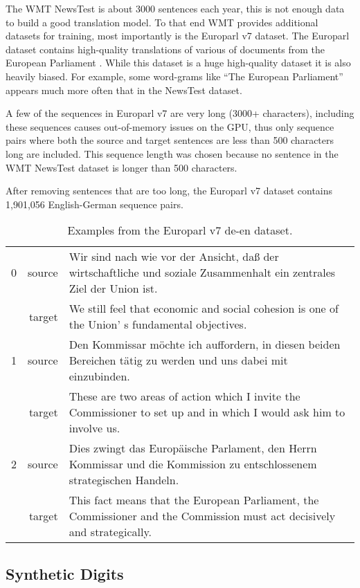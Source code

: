 The WMT NewsTest is about 3000 sentences each year, this is not enough data to build a good translation model. To that end WMT provides additional datasets for training, most importantly is the Europarl v7 dataset. The Europarl dataset contains high-quality translations of various of documents from the European Parliament \cite{europarl}. While this dataset is a huge high-quality dataset it is also heavily biased. For example, some word-grams like ``The European Parliament'' appears much more often that in the NewsTest dataset.

A few of the sequences in Europarl v7 are very long (3000+ characters), including these sequences causes out-of-memory issues on the GPU, thus only sequence pairs where both the source and target sentences are less than 500 characters long are included. This sequence length was chosen because no sentence in the WMT NewsTest dataset is longer than 500 characters.

After removing sentences that are too long, the Europarl v7 dataset contains 1,901,056 English-German sequence pairs.

\begin{table}[H]
\centering
\begin{tabular}{l|r|p{10cm}}
        0 & source & Wir sind nach wie vor der Ansicht, daß der wirtschaftliche und soziale Zusammenhalt ein zentrales Ziel der Union ist. \\[0.1cm]
          & target & We still feel that economic and social cohesion is one of the Union' s fundamental objectives. \\[0.1cm] \hline
        1 & source & Den Kommissar möchte ich auffordern, in diesen beiden Bereichen tätig zu werden und uns dabei mit einzubinden. \\[0.1cm]
          & target & These are two areas of action which I invite the Commissioner to set up and in which I would ask him to involve us. \\[0.1cm] \hline
        2 & source & Dies zwingt das Europäische Parlament, den Herrn Kommissar und die Kommission zu entschlossenem strategischen Handeln. \\[0.1cm]
          & target & This fact means that the European Parliament, the Commissioner and the Commission must act decisively and strategically.
\end{tabular}
\caption{Examples from the Europarl v7 de-en dataset.}
\end{table}

\subsection{Synthetic Digits}

